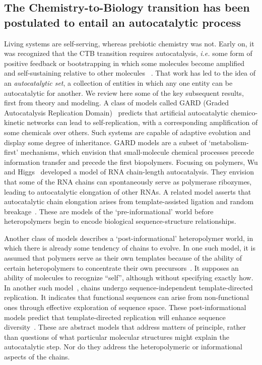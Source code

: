 \documentclass[5p,times]{elsarticle}
\begin{document}
 \subsection{The Chemistry-to-Biology transition has been postulated to entail an autocatalytic 
process}
 
 Living systems are self-serving, whereas prebiotic chemistry was not.  Early on, it was recognized 
that the CTB transition requires autocatalysis, \emph{i.e.} some form of positive feedback or 
bootstrapping in which some molecules become amplified and self-sustaining relative to other 
molecules 
~\cite{eigen1971selforganization,Eigen1977,Eigen1978,Dyson1985,Prigogine1989,Kauffman1986}.  That 
work has led to the idea of an \emph{autocatalytic set}, a collection of entities in which any one 
entity can be autocatalytic for another.  We review here some of the key subsequent results, first 
from theory and modeling.  A class of models called GARD (Graded Autocatalysis Replication 
Domain)~\cite{segre1998graded,Segre2000,Markovitch2012} predicts that artificial autocatalytic 
chemico-kinetic networks can lead to self-replication, with a corresponding amplification of some 
chemicals over others. Such systems are capable of adaptive evolution and display some degree of 
inheritance.  GARD models are a subset of `metabolism-first' mechanisms, which envision that 
small-molecule chemical processes precede information transfer and precede the first biopolymers.  
Focusing on polymers, Wu and Higgs~\cite{Wu2009} developed a model of RNA chain-length 
autocatalysis.  They envision that some of the RNA chains can spontaneously serve as polymerase 
ribozymes, leading to autocatalytic elongation of other RNAs.  A related model asserts that 
autocatalytic chain elongation arises from template-assisted ligation and random 
breakage~\cite{Tkachenko2014}.  These are models of the `pre-informational' world before 
heteropolymers begin to encode biological sequence-structure relationships.  
 
 Another class of models describes a `post-informational' heteropolymer world, in which there is 
already some tendency of chains to evolve.  In one such model, it is assumed that polymers serve as 
their own templates because of the ability of certain heteropolymers to concentrate their own 
precursors~\cite{nowak2008prevolutionary,Ohtsuki2009,Chen2012,Derr2012}.  It supposes an ability of 
molecules to recognize ``self'', although without specifying exactly how.  In another such 
model~\cite{Walker2012}, chains undergo sequence-independent template-directed replication.  It 
indicates that functional sequences can arise from non-functional ones through effective 
exploration of sequence space.  These post-informational models predict that template-directed 
replication will enhance sequence diversity~\cite{Derr2012}.   These are abstract models that 
address matters of principle, rather than questions of what particular molecular structures might 
explain the autocatalytic step. Nor do they address the heteropolymeric or informational aspects of 
the chains.
 
\end{document}
